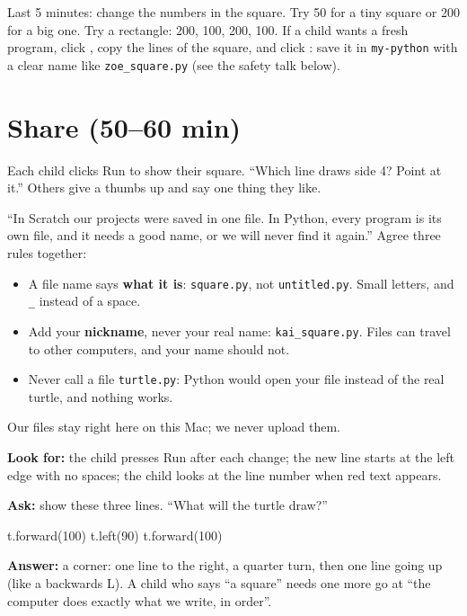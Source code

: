 \begin{freebuild}
Last 5 minutes: change the numbers in the square. Try 50 for a tiny square or 200 for a big one. Try a rectangle: 200, 100, 200, 100. If a child wants a fresh program, click , copy the lines of the square, and click : save it in \texttt{my-python} with a clear name like \texttt{zoe\_square.py} (see the safety talk below).
\end{freebuild}

\section{Share (50--60 min)}
\begin{teacherscript}
Each child clicks Run to show their square. \enquote{Which line draws side 4? Point at it.} Others give a thumbs up and say one thing they like.
\end{teacherscript}

\begin{safety}
\enquote{In Scratch our projects were saved in one file. In Python, every program is its own file, and it needs a good name, or we will never find it again.} Agree three rules together:
\begin{itemize}[leftmargin=1.2em,itemsep=1pt]
  \item A file name says \textbf{what it is}: \texttt{square.py}, not \texttt{untitled.py}. Small letters, and \texttt{\_} instead of a space.
  \item Add your \textbf{nickname}, never your real name: \texttt{kai\_square.py}. Files can travel to other computers, and your name should not.
  \item Never call a file \texttt{turtle.py}: Python would open your file instead of the real turtle, and nothing works.
\end{itemize}
Our files stay right here on this Mac; we never upload them.
\end{safety}

\begin{formativecheck}
\textbf{Look for:} the child presses Run after each change; the new line starts at the left edge with no spaces; the child looks at the line number when red text appears.

\textbf{Ask:} show these three lines. \enquote{What will the turtle draw?}
\begin{pycode}
t.forward(100)
t.left(90)
t.forward(100)
\end{pycode}
\textbf{Answer:} a corner: one line to the right, a quarter turn, then one line going up (like a backwards L). A child who says \enquote{a square} needs one more go at \enquote{the computer does exactly what we write, in order}.
\end{formativecheck}


